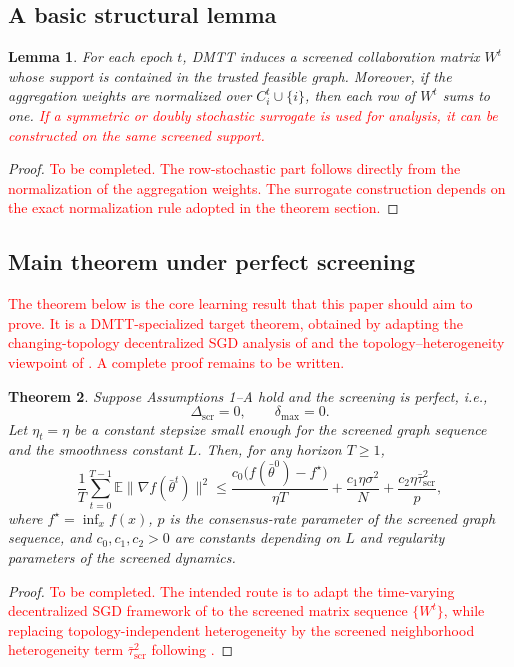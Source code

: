 \documentclass[journal]{IEEEtran}
\newtheorem{theorem}{Theorem}
\newtheorem{lemma}[theorem]{Lemma}
\theoremstyle{definition}
\theoremstyle{remark}
\begin{document}
\subsection{A basic structural lemma}

\begin{lemma}
For each epoch $t$, DMTT induces a screened collaboration matrix $W^t$ whose support is contained in the trusted feasible graph. Moreover, if the aggregation weights are normalized over $C_i^t\cup\{i\}$, then each row of $W^t$ sums to one. \textcolor{red}{If a symmetric or doubly stochastic surrogate is used for analysis, it can be constructed on the same screened support.}
\end{lemma}

\begin{proof}
\textcolor{red}{To be completed. The row-stochastic part follows directly from the normalization of the aggregation weights. The surrogate construction depends on the exact normalization rule adopted in the theorem section.}
\end{proof}

\subsection{Main theorem under perfect screening}
\textcolor{red}{The theorem below is the core learning result that this paper should aim to prove. It is a DMTT-specialized target theorem, obtained by adapting the changing-topology decentralized SGD analysis of \cite{koloskova2020unified} and the topology--heterogeneity viewpoint of \cite{le2023refined}. A complete proof remains to be written.}

\begin{theorem}
Suppose Assumptions 1--A hold and the screening is perfect, i.e.,
$$
\Delta_{\mathrm{scr}}=0,
\qquad
\delta_{\max}=0.
$$
Let $\eta_t=\eta$ be a constant stepsize small enough for the screened graph sequence and the smoothness constant $L$. Then, for any horizon $T\ge 1$,
$$
\frac{1}{T}\sum_{t=0}^{T-1}\mathbb E\|\nabla f(\bar\theta^t)\|^2
\le
\frac{c_0\big(f(\bar\theta^0)-f^\star\big)}{\eta T}
+
\frac{c_1\eta\sigma^2}{N}
+
\frac{c_2\eta\bar\tau_{\mathrm{scr}}^2}{p},
$$
where $f^\star=\inf_x f(x)$, $p$ is the consensus-rate parameter of the screened graph sequence, and $c_0,c_1,c_2>0$ are constants depending on $L$ and regularity parameters of the screened dynamics.
\end{theorem}

\begin{proof}
\textcolor{red}{To be completed. The intended route is to adapt the time-varying decentralized SGD framework of \cite{koloskova2020unified} to the screened matrix sequence $\{W^t\}$, while replacing topology-independent heterogeneity by the screened neighborhood heterogeneity term $\bar\tau_{\mathrm{scr}}^2$ following \cite{le2023refined}.}
\end{proof}
\end{document}
